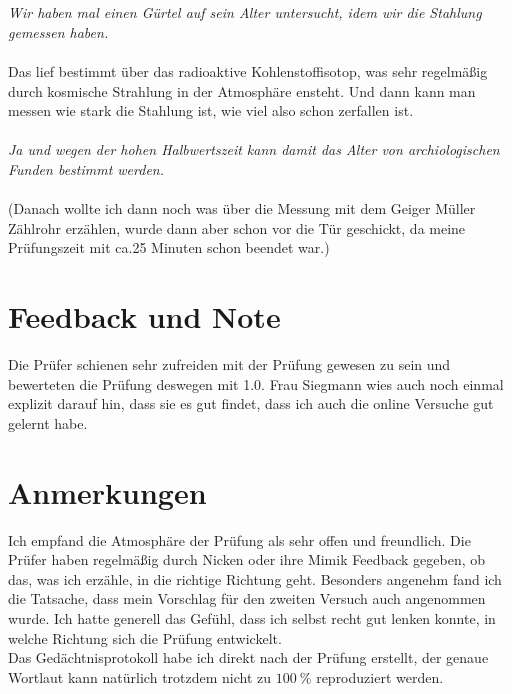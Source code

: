 \\\\\noindent
\textit{Wir haben mal einen Gürtel auf sein Alter untersucht, idem wir die Stahlung gemessen haben.}
\\\\\noindent
Das lief bestimmt über das radioaktive Kohlenstoffisotop, was sehr regelmäßig durch kosmische Strahlung in der Atmosphäre ensteht. Und 
dann kann man messen wie stark die Stahlung ist, wie viel also schon zerfallen ist. 
\\\\\noindent
\textit{Ja und wegen der hohen Halbwertszeit kann damit das Alter von archiologischen Funden bestimmt werden.}
\\\\\noindent
(Danach wollte ich dann noch was über die Messung mit dem Geiger Müller Zählrohr erzählen, wurde dann aber schon vor die Tür geschickt,
da meine Prüfungszeit mit ca.25 Minuten schon beendet war.)

\section{Feedback und Note}
Die Prüfer schienen sehr zufreiden mit der Prüfung gewesen zu sein und bewerteten die Prüfung deswegen mit 1.0. Frau Siegmann wies auch noch
einmal explizit darauf hin, dass sie es gut findet, dass ich auch die online Versuche gut gelernt habe. 

\section{Anmerkungen}
Ich empfand die Atmosphäre der Prüfung als sehr offen und freundlich. Die Prüfer haben regelmäßig durch Nicken oder ihre Mimik Feedback gegeben,
ob das, was ich erzähle, in die richtige Richtung geht. Besonders angenehm fand ich die Tatsache, dass mein Vorschlag für den zweiten 
Versuch auch angenommen wurde. Ich hatte generell das Gefühl, dass ich selbst recht gut lenken konnte, in welche Richtung
sich die Prüfung entwickelt.
\\\noindent
Das Gedächtnisprotokoll habe ich direkt nach der Prüfung erstellt, der genaue Wortlaut kann natürlich trotzdem nicht zu $\SI{100}{\percent}$
reproduziert werden.